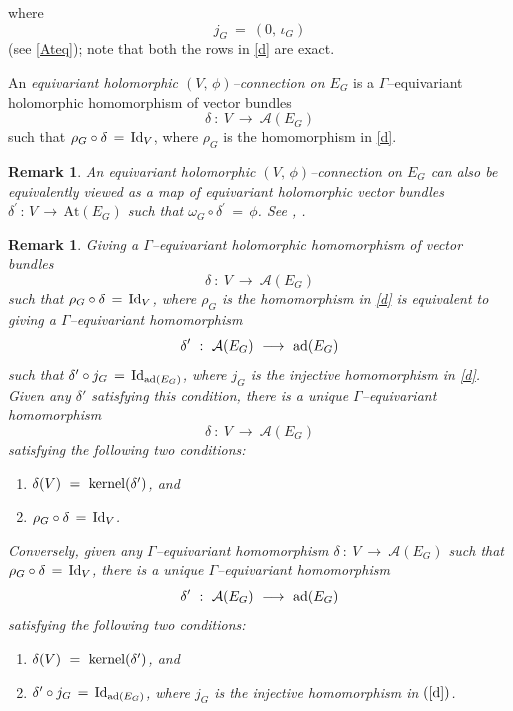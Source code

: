 \documentclass[12pt, reqno]{amsart}
\numberwithin{equation}{section}
\newtheorem{remark}[theorem]{Remark}
\newcommand{\At}{\textrm{At}}
\begin{document}
where \begin{equation}\label{r}
j_{G}\ =\ (0,\, \iota_{G})
\end{equation}
(see \eqref{Ateq}); note that both the rows in \eqref{d} are exact.

An {\it equivariant holomorphic $(V,\,\phi)$--connection on $E_{G}$} is a $\Gamma$--equivariant holomorphic
homomorphism of vector bundles
$$\delta\ :\ V\ \longrightarrow\ \mathcal{A}(E_{G})$$
such that $\rho_{G}\circ \delta\,=\,{\rm Id}_{V}$, where $\rho_G$ is the homomorphism in \eqref{d}.

\begin{remark}\label{rem}
An equivariant holomorphic $(V,\, \phi)$--connection on $E_{G}$ can also be equivalently viewed as a map of
equivariant holomorphic vector bundles $\delta^{'}\, :\,V\,\longrightarrow\, \At(E_{G})$ such that
$\omega_{G}\circ\delta^{'}\,=\,\phi$. See \cite{Bi1}, \cite[Lemma 2.2]{BBK}.
\end{remark}

\begin{remark}\label{rem0}
Giving a $\Gamma$--equivariant holomorphic homomorphism of vector bundles
$$\delta\ :\ V\ \longrightarrow\ \mathcal{A}(E_{G})$$ such that $\rho_{G}\circ \delta
\,=\,{\rm Id}_{V}$, where $\rho_G$ is the homomorphism in \eqref{d} is equivalent to giving a $\Gamma$--equivariant homomorphism
$$
\delta'\ :\ \mathcal{A}(E_{G}) \ \longrightarrow\ {\rm ad}(E_G)
$$
such that $\delta'\circ j_{G}\,=\, {\rm Id}_{{\rm ad}(E_G)}$, where $j_G$ is the injective homomorphism
in \eqref{d}. Given any $\delta'$ satisfying this condition, there is a unique $\Gamma$--equivariant homomorphism
$$\delta\ :\ V\ \longrightarrow\ \mathcal{A}(E_{G})$$
satisfying the following two conditions:
\begin{enumerate}
\item $\delta (V)\ =\ {\rm kernel}(\delta')$, and

\item $\rho_{G}\circ \delta\,=\,{\rm Id}_{V}$.
\end{enumerate}

Conversely, given any $\Gamma$--equivariant homomorphism $\delta\ :\ V\ \longrightarrow\ \mathcal{A}(E_{G})$
such that $\rho_{G}\circ \delta\,=\,{\rm Id}_{V}$, there is a unique $\Gamma$--equivariant homomorphism
$$
\delta'\ :\ \mathcal{A}(E_{G}) \ \longrightarrow\ {\rm ad}(E_G)
$$
satisfying the following two conditions:
\begin{enumerate}
\item $\delta (V)\ =\ {\rm kernel}(\delta')$, and

\item $\delta'\circ j_{G}\,=\, {\rm Id}_{{\rm ad}(E_G)}$, where $j_G$ is the injective homomorphism in $(\ref{d})$.
\end{enumerate}
\end{remark}
\end{document}
